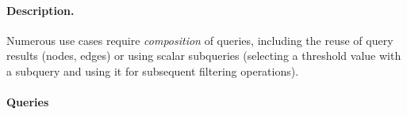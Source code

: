 
\paragraph{Description.}

Numerous use cases require \emph{composition} of queries, including the reuse of
query results (\eg nodes, edges) or using scalar subqueries (\eg selecting a
threshold value with a subquery and using it for subsequent filtering
operations).


\paragraph{Queries}
{\raggedright
}
